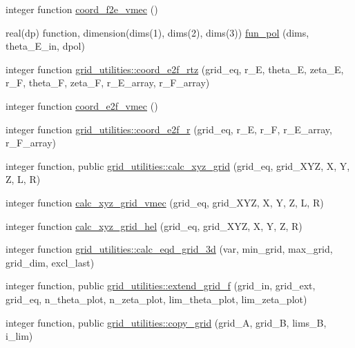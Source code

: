 \begin{DoxyCompactItemize}
\item 
integer function \hyperlink{grid__utilities_8f90_aa4643f558c5d0e6149c4a8cbd289777d}{coord\+\_\+f2e\+\_\+vmec} ()
\item 
real(dp) function, dimension(dims(1), dims(2), dims(3)) \hyperlink{grid__utilities_8f90_a38078beae178a5dcd051e2ed858d4d35}{fun\+\_\+pol} (dims, theta\+\_\+\+E\+\_\+in, dpol)
\item 
integer function \hyperlink{namespacegrid__utilities_a2a3c0509679b438d9d5aa5bedfb7a7b8}{grid\+\_\+utilities\+::coord\+\_\+e2f\+\_\+rtz} (grid\+\_\+eq, r\+\_\+E, theta\+\_\+E, zeta\+\_\+E, r\+\_\+F, theta\+\_\+F, zeta\+\_\+F, r\+\_\+\+E\+\_\+array, r\+\_\+\+F\+\_\+array)
\item 
integer function \hyperlink{grid__utilities_8f90_af4a8f2c9e0c72e80e6cbac35617e5f80}{coord\+\_\+e2f\+\_\+vmec} ()
\item 
integer function \hyperlink{namespacegrid__utilities_a7866b2c198255dec7904dac73ccf4340}{grid\+\_\+utilities\+::coord\+\_\+e2f\+\_\+r} (grid\+\_\+eq, r\+\_\+E, r\+\_\+F, r\+\_\+\+E\+\_\+array, r\+\_\+\+F\+\_\+array)
\item 
integer function, public \hyperlink{namespacegrid__utilities_a39e7cd9b8f173994358dbdd6b57827e1}{grid\+\_\+utilities\+::calc\+\_\+xyz\+\_\+grid} (grid\+\_\+eq, grid\+\_\+\+X\+YZ, X, Y, Z, L, R)
\item 
integer function \hyperlink{grid__utilities_8f90_aaabf4a8fdce3679e99ff8f8a9a30fcaf}{calc\+\_\+xyz\+\_\+grid\+\_\+vmec} (grid\+\_\+eq, grid\+\_\+\+X\+YZ, X, Y, Z, L, R)
\item 
integer function \hyperlink{grid__utilities_8f90_ad39ac81f24bae991c679caf84a4ad757}{calc\+\_\+xyz\+\_\+grid\+\_\+hel} (grid\+\_\+eq, grid\+\_\+\+X\+YZ, X, Y, Z, R)
\item 
integer function \hyperlink{namespacegrid__utilities_a1725fdd7bdf52d436152c5e327c36be4}{grid\+\_\+utilities\+::calc\+\_\+eqd\+\_\+grid\+\_\+3d} (var, min\+\_\+grid, max\+\_\+grid, grid\+\_\+dim, excl\+\_\+last)
\item 
integer function, public \hyperlink{namespacegrid__utilities_a414a1a11924bc935afca3a89fc31f2f5}{grid\+\_\+utilities\+::extend\+\_\+grid\+\_\+f} (grid\+\_\+in, grid\+\_\+ext, grid\+\_\+eq, n\+\_\+theta\+\_\+plot, n\+\_\+zeta\+\_\+plot, lim\+\_\+theta\+\_\+plot, lim\+\_\+zeta\+\_\+plot)
\item 
integer function, public \hyperlink{namespacegrid__utilities_a04f971c38083f873a04eb6568bed466b}{grid\+\_\+utilities\+::copy\+\_\+grid} (grid\+\_\+A, grid\+\_\+B, lims\+\_\+B, i\+\_\+lim)

\end{DoxyCompactItemize}
